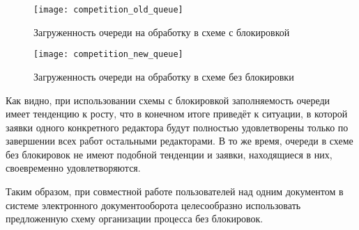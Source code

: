 \begin{figure}[h!]
  \centering
  \texttt{[image: competition\_old\_queue]}
  \caption{Загруженность очереди на обработку в схеме с блокировкой}
  \label{img:competition_old_queue}
\end{figure}

\begin{figure}[h!]
  \centering
  \texttt{[image: competition\_new\_queue]}
  \caption{Загруженность очереди на обработку в схеме без блокировки}
  \label{img:competition_new_queue}
\end{figure}

\vspace{\baselineskip}
Как видно, при использовании схемы с блокировкой заполняемость очереди имеет тенденцию к росту, что в конечном итоге приведёт к ситуации, в которой заявки одного конкретного редактора будут полностью удовлетворены только по завершении всех работ остальными редакторами. В то же время, очереди в схеме без блокировок не имеют подобной тенденции и заявки, находящиеся в них, своевременно удовлетворяются.

\vspace{\baselineskip}
Таким образом, при совместной работе пользователей над одним документом в системе электронного документооборота целесообразно использовать предложенную схему организации процесса без блокировок.